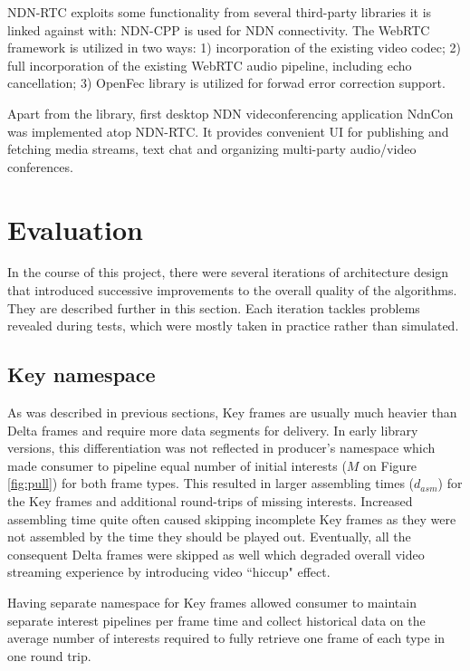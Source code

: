\documentclass{icn/sig-alternate-2012} %
\newcommand{\ndnrtcName}{NDN-RTC} %
\newcommand{\ndnconName}{NdnCon}
\begin{document}
\ndnrtcName{} exploits some functionality from several third-party libraries it is linked against with: NDN-CPP \cite{ndnccl} is used for NDN connectivity. The WebRTC framework \cite{webrtc} is utilized in two ways: 1) incorporation of the existing video codec; 2) full incorporation of the existing WebRTC audio pipeline, including echo cancellation;  3) OpenFec \cite{openfec} library is utilized for forwad error correction support.

Apart from the library, first desktop NDN videconferencing application \ndnconName{} \cite{ndncon} was implemented atop \ndnrtcName{}. It provides convenient UI for publishing and fetching media streams, text chat and organizing multi-party audio/video conferences.

\section{Evaluation}
\label{sec:eval} 
In the course of this project, there were several iterations of architecture design that introduced successive improvements to the overall quality of the algorithms. They are described further in this section. Each iteration tackles problems revealed during tests, which were mostly taken in practice rather than simulated.

\subsection{Key namespace}
As was described in previous sections, Key frames are usually much heavier than Delta frames and require more data segments for delivery. In early library versions, this differentiation was not reflected in producer's namespace which made consumer to pipeline equal number of initial interests ($M$ on Figure \ref{fig:pull}) for both frame types. This resulted in larger assembling times ($d_{asm}$) for the Key frames and additional round-trips of missing interests. Increased assembling time quite often caused skipping incomplete Key frames as they were not assembled by the time they should be played out. Eventually, all the consequent Delta frames were skipped as well which degraded overall video streaming experience by introducing video ``hiccup" effect.

Having separate namespace for Key frames allowed consumer to maintain separate interest pipelines per frame time and collect historical data on the average number of interests required to fully retrieve one frame of each type in one round trip.
\end{document}
